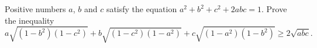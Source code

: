 \problem
Positive numbers $a$, $b$ and $c$ satisfy the equation $a^2+b^2+c^2+2abc=1$.
Prove the inequality
\[
    a \sqrt{(1 - b^2) (1 - c^2)}
    +
    b \sqrt{(1 - c^2) (1 - a^2)}
    +
    c \sqrt{(1 - a^2) (1 - b^2)}
\geq
    2 \sqrt{abc}
.\]

\solution

\endproblem
